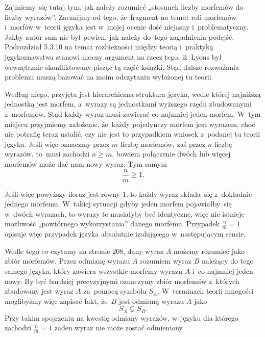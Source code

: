 \documentclass[a4paper,11pt]{article}
\begin{document}
\vspace{\spaceFour}





 Zajmiemy~się tutaj tym, jak należy rozumieć „stosunek
liczby morfemów do liczby wyrazów”. Zacznijmy od tego, że~fragment na temat
roli morfemów i~morfów w~teorii języka jest w~mojej ocenie dość niejasny
i~problematyczny. Jakby autor sam nie był pewien, jak należy do~tego
zagadnienia podejść. Podrozdział 5.3.10 na temat rozbieżności między teorią
i~praktyką językoznawstwa stanowi mocny argument na rzecz tego, iż~Lyons był
wewnętrznie skonfliktowany pisząc tą część książki. Stąd dalsze rozważania
problemu muszą bazować na moim odczytaniu wyłożonej tu teorii.

Według niego, przyjęta jest hierarchiczna struktura języka, wedle której
najniższą jednostką jest morfem, a~wyrazy są jednostkami wyższego rzędu
zbudowanymi z~morfemów. Stąd każdy wyraz musi zawierać co najmniej jeden
morfem. W~tym miejscu przyjmiemy założenie, że~każdy pojedynczy morfem jest
wyrazem, choć nie potrafię teraz ustalić, czy nie jest to przypadkiem
wniosek z~podanej tu teorii języka. Jeśli więc oznaczmy przez $m$ liczbę
morfemów, zaś przez $n$ liczbę wyrazów, to~musi zachodzi $n \geq m$, bowiem
połączenie dwóch lub więcej morfemów może dać nam nowy wyraz. Tym samym
\begin{equation}
  \label{eq:Lyons-Wstep-do-jezykoznawstwa-01}
  \frac{ n }{ m } \geq 1.
\end{equation}

Jeśli więc powyższy iloraz jest równy $1$, to każdy wyraz składa~się
z~dokładnie jednego morfemu. W~takiej sytuacji gdyby jeden morfem
pojawiałby~się w~dwóch wyrazach, to wyrazy te musiałyby być identyczne, więc
nie istnieje możliwość „powtórnego wykorzystania” danego morfemu.
Przypadek $\frac{ n }{ m } = 1$ opisuje więc przypadek języka
absolutnie izolującego w~następującym sensie.

Wedle tego co czytamy na stronie 208, dany wyraz $A$ możemy rozumieć jako
zbiór morfemów. Przez odmianę wyrazu $A$ rozumiem wyraz $B$ należący do tego
samego języka, który zawiera wszystkie morfemy wyrazu $A$ i~co najmniej
jeden nowy. By być bardziej precyzyjnymi oznaczymy zbiór morfemów z~których
zbudowany jest wyraz $A$ za~pomocą symbolu $S_{ A }$. W~terminach teorii
mnogości moglibyśmy więc zapisać fakt, że~$B$ jest odmianą wyrazu $A$ jako
\begin{equation}
  \label{eq:Lyons-Wstep-do-jezykoznawstwa-02}
  S_{ A } \subsetneq S_{ B }.
\end{equation}
Przy takim spojrzeniu na kwestię odmiany wyrazów, w~języku dla którego
zachodzi $\frac{ n }{ m } = 1$ żaden wyraz nie może zostać odmieniony.
\end{document}
